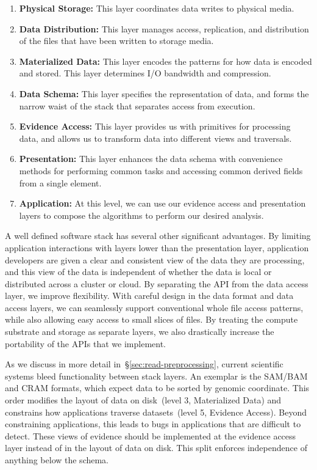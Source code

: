 \documentclass[phd]{ucbthesis}
\begin{document}
\begin{enumerate}
\item \textbf{Physical Storage:} This layer coordinates data writes to physical media.
\item \textbf{Data Distribution:} This layer manages access, replication, and distribution of the files that have
been written to storage media.
\item \textbf{Materialized Data:} This layer encodes the patterns for how data is encoded and stored. This
layer determines I/O bandwidth and compression.
\item \textbf{Data Schema:} This layer specifies the representation of data, and forms the narrow waist of
the stack that separates access from execution.
\item \textbf{Evidence Access:} This layer provides us with primitives for processing data, and allows us to
transform data into different views and traversals.
\item \textbf{Presentation:} This layer enhances the data schema with convenience methods for performing
common tasks and accessing common derived fields from a single element.
\item \textbf{Application:} At this level, we can use our evidence access and presentation layers to compose
the algorithms to perform our desired analysis.
\end{enumerate}

A well defined software stack has several other significant advantages. By limiting application
interactions with layers lower than the presentation layer, application developers are given a clear and
consistent view of the data they are processing, and this view of the data is independent of whether the
data is local or distributed across a cluster or cloud. By separating the API from the data access layer,
we improve flexibility. With careful design in the data format and data access layers, we can seamlessly
support conventional whole file access patterns, while also allowing easy access to small slices of files.
By treating the compute substrate and storage as separate layers, we also drastically increase
the portability of the APIs that we implement.

As we discuss in more detail in~\S\ref{sec:read-preprocessing}, current scientific systems bleed
functionality between stack layers. An exemplar is the SAM/BAM and CRAM formats, which expect data
to be sorted by genomic coordinate. This order modifies the layout of data on disk~(level 3, Materialized Data)
and constrains how applications traverse datasets~(level 5, Evidence Access). Beyond
constraining applications, this leads to bugs in applications that are difficult to detect.
These views of evidence should be implemented at the evidence
access layer instead of in the layout of data on disk. This split enforces independence of anything below the
schema.
\end{document}
